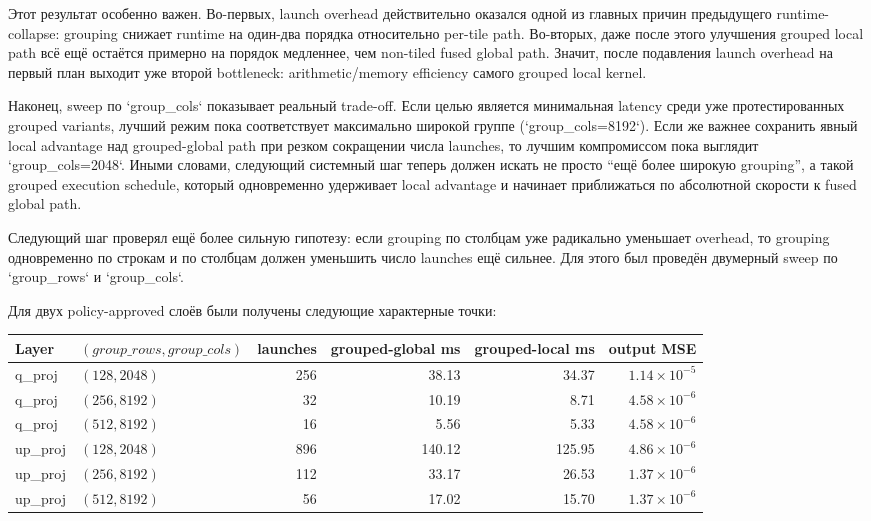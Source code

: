 Этот результат особенно важен. Во-первых, launch overhead действительно
оказался одной из главных причин предыдущего runtime-collapse: grouping снижает
runtime на один-два порядка относительно per-tile path. Во-вторых, даже после
этого улучшения grouped local path всё ещё остаётся примерно на порядок
медленнее, чем non-tiled fused global path. Значит, после подавления launch
overhead на первый план выходит уже второй bottleneck: arithmetic/memory
efficiency самого grouped local kernel.

Наконец, sweep по `group\_cols` показывает реальный trade-off. Если целью
является минимальная latency среди уже протестированных grouped variants,
лучший режим пока соответствует максимально широкой группе (`group\_cols=8192`).
Если же важнее сохранить явный local advantage над grouped-global path при
резком сокращении числа launches, то лучшим компромиссом пока выглядит
`group\_cols=2048`. Иными словами, следующий системный шаг теперь должен
искать не просто ``ещё более широкую grouping'', а такой grouped execution
schedule, который одновременно удерживает local advantage и начинает
приближаться по абсолютной скорости к fused global path.

Следующий шаг проверял ещё более сильную гипотезу: если grouping по столбцам
уже радикально уменьшает overhead, то grouping одновременно по строкам и по
столбцам должен уменьшить число launches ещё сильнее. Для этого был проведён
двумерный sweep по `group\_rows` и `group\_cols`.

Для двух policy-approved слоёв были получены следующие характерные точки:

\begin{center}
\begin{tabular}{llrrrr}
\toprule
Layer & $(group\_rows, group\_cols)$ & launches & grouped-global ms & grouped-local ms & output MSE \\
\midrule
q\_proj & $(128, 2048)$ & 256 & 38.13 & 34.37 & $1.14 \times 10^{-5}$ \\
q\_proj & $(256, 8192)$ & 32 & 10.19 & 8.71 & $4.58 \times 10^{-6}$ \\
q\_proj & $(512, 8192)$ & 16 & 5.56 & 5.33 & $4.58 \times 10^{-6}$ \\
up\_proj & $(128, 2048)$ & 896 & 140.12 & 125.95 & $4.86 \times 10^{-6}$ \\
up\_proj & $(256, 8192)$ & 112 & 33.17 & 26.53 & $1.37 \times 10^{-6}$ \\
up\_proj & $(512, 8192)$ & 56 & 17.02 & 15.70 & $1.37 \times 10^{-6}$ \\
\bottomrule
\end{tabular}
\end{center}

